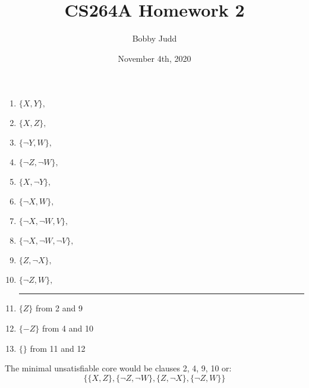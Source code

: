 \documentclass{article}
\title{CS264A Homework 2}
\author{Bobby Judd}
\date{November 4th, 2020}
\begin{document}
\maketitle

\clearpage
\section{}
\begin{enumerate}
    \item $\{X, Y\},$
    \item $\{X, Z\},$
    \item $\{\lnot Y, W\},$
    \item $\{\lnot Z, \lnot W\},$
    \item $\{X, \lnot Y\},$
    \item $\{\lnot X, W\},$
    \item $\{\lnot X, \lnot W, V\},$
    \item $\{\lnot X, \lnot W, \lnot V\},$
    \item $\{Z, \lnot X\},$
    \item $\{\lnot Z, W\},$
    \newline
    \noindent\rule{4cm}{0.4pt}
    \item $\{Z\}$ \quad from 2 and 9
    \item $\{-Z\}$ \quad from 4 and 10
    \item $\{\}$ \quad from 11 and 12
\end{enumerate}
The minimal unsatisfiable core would be clauses 2, 4, 9, 10 or:
\[\{\{X, Z\}, \{\lnot Z, \lnot W\}, \{Z, \lnot X\}, \{\lnot Z, W\}\}\]

\clearpage
\end{document}
